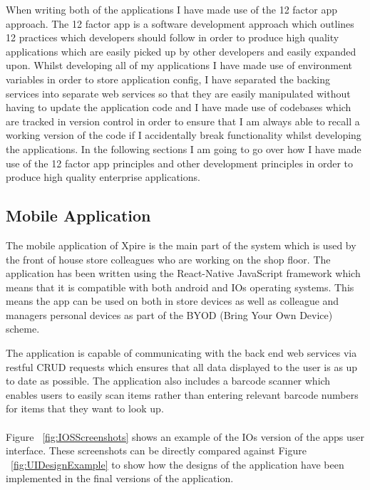 \documentclass[a4paper,11pt]{report}
\begin{document}
When writing both of the applications I have made use of the 12 factor app \cite{twelve-factor} approach. The 12 factor app is a software development approach which outlines 12 practices which developers should follow in order to produce high quality applications which are easily picked up by other developers and easily expanded upon. 
Whilst developing all of my applications I have made use of environment variables in order to store application config, I have separated the backing services into separate web services so that they are easily manipulated without having to update the application code and I have made use of codebases which are tracked in version control in order to ensure that I am always able to recall a working version of the code if I accidentally break functionality whilst developing the applications.
In the following sections I am going to go over how I have made use of the 12 factor app principles and other development principles in order to produce high quality enterprise applications.

\subsection{Mobile Application}
The mobile application of Xpire is the main part of the system which is used by the front of house store colleagues who are working on the shop floor.
The application has been written using the React-Native JavaScript framework which means that it is compatible with both android and IOs operating systems.
This means the app can be used on both in store devices as well as colleague and managers personal devices as part of the BYOD (Bring Your Own Device) scheme. 

The application is capable of communicating with the back end web services via restful CRUD requests which ensures that all data displayed to the user is as up to date as possible.
The application also includes a barcode scanner which enables users to easily scan items rather than entering relevant barcode numbers for items that they want to look up. 
\\
\\
Figure ~\ref{fig:IOSScreenshots} shows an example of the IOs version of the apps user interface. These screenshots can be directly compared against Figure ~\ref{fig:UIDesignExample}
 to show how the designs of the application have been implemented in the final versions of the application.
\end{document}
